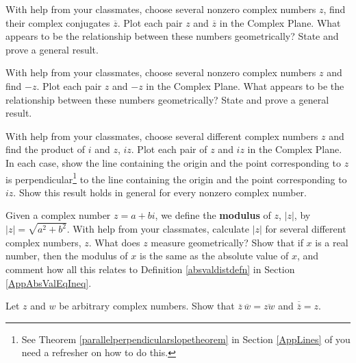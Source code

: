 \documentclass{ximera}
\begin{document}
\begin{problem}\label{cmpgeoalgexfirst}
With help from your classmates, choose several nonzero complex numbers $z$, find their complex conjugates $\overline{z}$.  Plot each pair $z$ and $\overline{z}$ in the Complex Plane.  What appears to be the relationship between these numbers geometrically?  State and prove a general result. 
\end{problem}

\begin{problem}
With help from your classmates, choose several nonzero complex numbers $z$ and  find $-z$.  Plot each pair $z$ and $-z$ in the Complex Plane.  What appears to be the relationship between these numbers geometrically?  State and prove a general result.
\end{problem}

\begin{problem}
With help from your classmates, choose several different complex numbers $z$ and find the product of $i$ and $z$,  $iz$.  Plot each pair of $z$ and $iz$ in the Complex Plane.  In each case, show the line containing the origin and the point corresponding to $z$ is perpendicular\footnote{See Theorem \ref{parallelperpendicularslopetheorem} in Section \ref{AppLines} of you need a refresher on how to do this.} to the line containing the origin and the point corresponding to $iz$.  Show this result holds in general for every nonzero complex number.
\end{problem}

\begin{problem}\label{cmpgeoalgexlast}
Given a complex number $z = a+bi$, we define the \textbf{modulus} of $z$, $|z|$, by $|z| = \sqrt{a^2+b^2}$.  With help from your classmates, calculate $|z|$ for several different complex numbers, $z$.  What does $z$ measure geometrically?  Show that if $x$ is a real number, then the modulus of $x$ is the same as the absolute value of $x$, and comment how all this relates to Definition \ref{absvaldistdefn} in Section \ref{AppAbsValEqIneq}.
\end{problem}

\begin{problem}\label{zbarexercise}
Let $z$ and $w$ be arbitrary complex numbers.  Show that  $\overline{z} \, \overline{w}  = \overline{zw}$ and $\overline{\overline{z}} = z$.  
\end{problem}  
\end{document}
